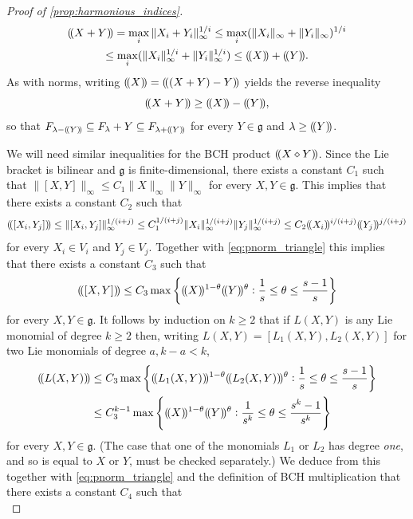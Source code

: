 \documentclass[11pt]{article}
\numberwithin{equation}{section}
\theoremstyle{plain}
\theoremstyle{definition}
\theoremstyle{remark}
\numberwithin{equation}{section}
\numberwithin{equation}{section}
\DeclarePairedDelimiter\pnorm{(\!(}{)\!)}
\begin{document}
\begin{proof}[Proof of \cref{prop:harmonious_indices}]
\begin{multline}
\pnorm{X+Y} = \max_i \|X_i+Y_i\|_\infty^{1/i} \leq \max_i (\|X_i\|_\infty+\|Y_i\|_\infty)^{1/i}  
\\\leq \max_i (\|X_i\|_\infty^{1/i}+\|Y_i\|_\infty^{1/i}) \leq \pnorm{X}+\pnorm{Y}.
\end{multline}
As with norms, writing $\pnorm{X} = \pnorm{(X+Y)-Y}$ yields the reverse inequality
\begin{equation}\label{eq:pnorm_reverse_triangle}\pnorm{X+Y} \geq \pnorm{X}-\pnorm{Y},\end{equation}
so that
$F_{\lambda-\pnorm{Y}} \subseteq F_\lambda + Y \subseteq F_{\lambda+\pnorm{Y}}$ for every $Y \in \mathfrak{g}$ and $\lambda \geq \pnorm{Y}$.

\medskip

We will need similar inequalities for the BCH product $\pnorm{X\diamond Y}$. Since the Lie bracket is bilinear and $\mathfrak{g}$ is finite-dimensional, there exists a constant $C_1$ such that $\|[X,Y]\|_\infty \leq C_1\|X\|_\infty \|Y\|_\infty$ for every $X,Y\in \mathfrak{g}$. This implies that there exists a constant $C_2$ such that
%
%
%
%
%
%
\[
\pnorm{[X_i,Y_j]} \leq \|[X_i,Y_j]\|_\infty^{1/(i+j)} \leq C_1^{1/(i+j)}\|X_i\|_\infty^{1/(i+j)}\|Y_j\|_\infty^{1/(i+j)} \leq C_2 \pnorm{X_i}^{i/(i+j)}\pnorm{Y_j}^{j/(i+j)}
\]
for every $X_i\in V_i$ and $Y_j \in V_j$. Together with \eqref{eq:pnorm_triangle} this implies that there exists a constant $C_3$ such that
\[
\pnorm{[X,Y]} \leq C_3 \max\left\{\pnorm{X}^{1-\theta}\pnorm{Y}^{\theta}:\frac{1}{s}\leq \theta \leq \frac{s-1}{s}\right\}
\]
for every $X,Y\in \mathfrak{g}$. It follows by induction on $k\geq 2$ that if $L(X,Y)$ is any Lie monomial of degree $k \geq 2$ then, writing $L(X,Y)=[L_1(X,Y),L_2(X,Y)]$ for two Lie monomials of degree $a,k-a<k$,
\begin{align*}
\pnorm{L(X,Y)} &\leq 
C_3 \max\left\{\pnorm{L_1(X,Y)}^{1-\theta}\pnorm{L_2(X,Y)}^{\theta}: \frac{1}{s} \leq \theta \leq \frac{s-1}{s}\right\}
\\&\leq
C^{k-1}_3 \max\left\{\pnorm{X}^{1-\theta}\pnorm{Y}^{\theta}:\frac{1}{s^k} \leq \theta \leq \frac{s^k-1}{s^k}\right\}
\end{align*}
for every $X,Y\in \mathfrak{g}$. (The case that one of the monomials $L_1$ or $L_2$ has degree \emph{one}, and so is equal to $X$ or $Y$, must be checked separately.) We deduce from this together with \eqref{eq:pnorm_triangle} and the definition of BCH multiplication that there exists a constant $C_4$ such that
\begin{equation}
\label{eq:pnorm_BCH_triangle}

\end{equation}
\end{proof}
\end{document}
